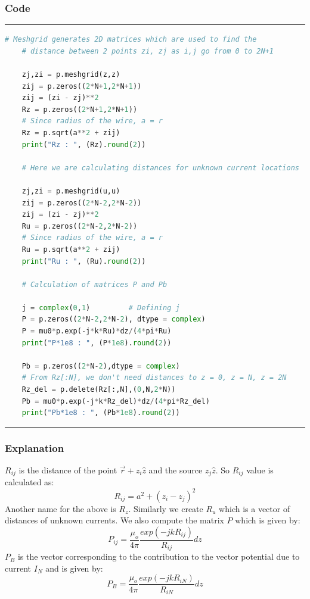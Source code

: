 \documentclass[12pt, a4paper]{article}
\begin{document}
\subsubsection{Code}
\hrule
    \begin{lstlisting}[language=Python]
    # Meshgrid generates 2D matrices which are used to find the 
    # distance between 2 points zi, zj as i,j go from 0 to 2N+1
    
    zj,zi = p.meshgrid(z,z)
    zij = p.zeros((2*N+1,2*N+1))
    zij = (zi - zj)**2
    Rz = p.zeros((2*N+1,2*N+1))
    # Since radius of the wire, a = r
    Rz = p.sqrt(a**2 + zij)               
    print("Rz : ", (Rz).round(2))
    
    # Here we are calculating distances for unknown current locations
    
    zj,zi = p.meshgrid(u,u)
    zij = p.zeros((2*N-2,2*N-2))
    zij = (zi - zj)**2
    Ru = p.zeros((2*N-2,2*N-2))
    # Since radius of the wire, a = r
    Ru = p.sqrt(a**2 + zij)               
    print("Ru : ", (Ru).round(2))
    
    # Calculation of matrices P and Pb
    
    j = complex(0,1)         # Defining j       
    P = p.zeros((2*N-2,2*N-2), dtype = complex)
    P = mu0*p.exp(-j*k*Ru)*dz/(4*pi*Ru)
    print("P*1e8 : ", (P*1e8).round(2))
    
    Pb = p.zeros((2*N-2),dtype = complex)
    # From Rz[:N], we don't need distances to z = 0, z = N, z = 2N
    Rz_del = p.delete(Rz[:,N],(0,N,2*N))
    Pb = mu0*p.exp(-j*k*Rz_del)*dz/(4*pi*Rz_del)
    print("Pb*1e8 : ", (Pb*1e8).round(2))
    \end{lstlisting}
\hrule
\subsubsection{Explanation}
$R_{ij}$ is the distance of the point $\vec{r} + z_{i}\hat{z}$ and the source $z_{j}\hat{z}$. So $R_{ij}$ value is calculated as:
\begin{equation*}
    R_{ij} = a^{2} + (z_{i}-z_{j})^{2}
\end{equation*}
Another name for the above is $R_{z}$. Similarly we create $R_{u}$ which is a vector of distances of unknown currents. We also compute the matrix $P$ which is given by:
\begin{equation*}
    P_{ij} = \frac{\mu_{o}}{4\pi}\frac{exp(-jkR_{ij})}{R_{ij}}dz
\end{equation*}
$P_{B}$ is the vector corresponding to the contribution to the vector potential due to current $I_{N}$ and is given by:
\vspace*{0.3cm}
\begin{equation*}
    P_{B} = \frac{\mu_{o}}{4\pi}\frac{exp(-jkR_{iN})}{R_{iN}}dz
\end{equation*}
\end{document}

